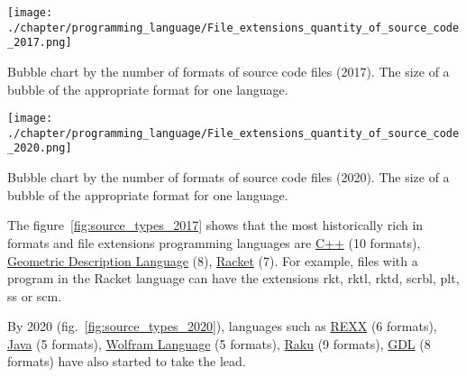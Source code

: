 \begin{marginfigure}[-15cm]
	\texttt{[image: ./chapter/programming\_language/File\_extensions\_quantity\_of\_source\_code\_2017.png]}
	\caption[Bubble chart by the number of formats of source code files (2017).]{Bubble chart by the number of formats of source code files (2017). The size of a bubble of the appropriate format for one language.}
	\label{fig:source_types_2017}
\end{marginfigure}
\begin{marginfigure}[-3cm]
	\texttt{[image: ./chapter/programming\_language/File\_extensions\_quantity\_of\_source\_code\_2020.png]}
	\caption[Bubble chart by the number of formats of source code files (2020).]{Bubble chart by the number of formats of source code files (2020). The size of a bubble of the appropriate format for one language.}
	\label{fig:source_types_2020}
\end{marginfigure}

The figure~\ref{fig:source_types_2017} shows that the most historically rich in formats and file extensions programming languages are \href{https://en.wikipedia.org/wiki/C\%2B\%2B}{C++} (10 formats), \href{https://en.wikipedia.org/wiki/Geometric_Description_Language}{Geometric Description Language} (8), \href{https://en.wikipedia.org/wiki/Racket}{Racket} (7). For example, files with a program in the Racket language can have the extensions rkt, rktl, rktd, scrbl, plt, ss or scm.

\label{question:prog_lang_2}

By 2020 (fig.~\ref{fig:source_types_2020}), languages such as  \href{https://en.wikipedia.org/wiki/REXX}{REXX} (6 formats), \href{https://en.wikipedia.org/wiki/Java_(programming_language)}{Java} (5 formats), \href{https://en.wikipedia.org/wiki/Wolfram_Language}{Wolfram Language} (5 formats), \href{https://en.wikipedia.org/wiki/Raku_(programming_language)}{Raku} (9 formats), \href{https://en.wikipedia.org/wiki/Geometric_Description_Language}{GDL} (8 formats) have also started to take the lead.

